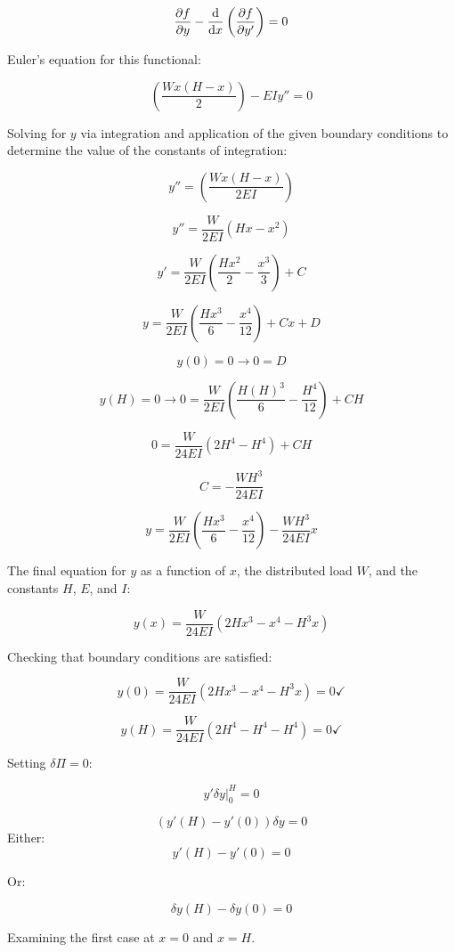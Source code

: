 \documentclass[../main.tex]{subfiles}
\begin{document}
\[
    \pdv{f}{y} - \dv{x}\left({\pdv{f}{y'}}\right) = 0
\]

Euler's equation for this functional:

\[
    \left({\frac{Wx(H-x)}{2}}\right) - EIy'' = 0
\]

Solving for \(y\) via integration and application of the given boundary conditions to determine the value of the constants of integration:

\[
    y'' = \left({\frac{Wx(H-x)}{2EI}}\right)
\]

\[
    y'' = \frac{W}{2EI} \left({Hx-x^2}\right)
\]

\[
    y' =  \frac{W}{2EI} \left({\frac{Hx^2}{2} - \frac{x^3}{3}}\right) + C
\]

\[
    y =  \frac{W}{2EI} \left({\frac{Hx^3}{6} - \frac{x^4}{12}}\right) + Cx + D
\]

\[
    y(0) = 0 \rightarrow 0 = D
\]

\[
    y(H) = 0 \rightarrow 0 =  \frac{W}{2EI} \left({\frac{H(H)^3}{6} - \frac{H^4}{12}}\right) + CH
\]

\[
    0 =  \frac{W}{24EI} \left({2H^4 - H^4}\right) + CH
\]

\[
    C =  -\frac{WH^3}{24EI}
\]

\[
    y =  \frac{W}{2EI} \left({\frac{Hx^3}{6} - \frac{x^4}{12}}\right) -\frac{WH^3}{24EI} x
\]

The final equation for \(y\) as a function of \(x\), the distributed load \(W\), and the constants \(H\), \(E\), and \(I\):

\[  
    \boxed{
    y(x) =  \frac{W}{24EI} \left({2Hx^3 - x^4 - H^3 x}\right)
    }
\]

Checking that boundary conditions are satisfied:

\[
    y(0) =  \frac{W}{24EI} \left({2Hx^3 - x^4 - H^3 x}\right) = 0 \checkmark    
\]

\[
    y(H) =  \frac{W}{24EI} \left({2H^4 - H^4 - H^4}\right) = 0 \checkmark
\]


Setting  \(\delta \Pi = 0\):

\[
    \left.{y'\delta y}\right|_0^H = 0
\]

\[
    (y'(H)-y'(0))\delta y = 0  
\]
Either:
\[
    y'(H) - y'(0) = 0 
\]

Or:

\[
    \delta y(H) - \delta y (0) = 0
\]

Examining the first case at \(x=0\) and \(x=H\). 
\end{document}
